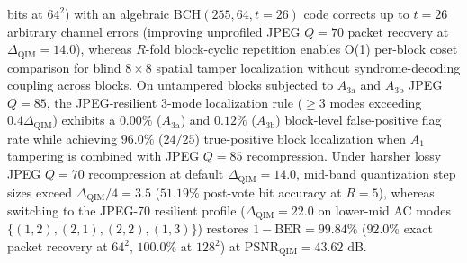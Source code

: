 \documentclass[conference,10pt]{IEEEtran}
\begin{document}
\begin{itemize}
bits at $64^2$) with an algebraic $\mathrm{BCH}(255,64,t=26)$ code corrects up to $t=26$ arbitrary channel errors (improving unprofiled JPEG $Q=70$ packet recovery at $\Delta_{\text{QIM}}=14.0$), whereas $R$-fold block-cyclic repetition enables O(1) per-block coset comparison for blind $8\times 8$ spatial tamper localization without syndrome-decoding coupling across blocks. On untampered blocks subjected to $A_{3\text{a}}$ and $A_{3\text{b}}$ JPEG $Q=85$, the JPEG-resilient 3-mode localization rule ($\ge 3$ modes exceeding $0.4\Delta_{\text{QIM}}$) exhibits a $0.00\%$ ($A_{3\text{a}}$) and $0.12\%$ ($A_{3\text{b}}$) block-level false-positive flag rate while achieving $96.0\%$ ($24/25$) true-positive block localization when $A_1$ tampering is combined with JPEG $Q=85$ recompression. Under harsher lossy JPEG $Q=70$ recompression at default $\Delta_{\text{QIM}} = 14.0$, mid-band quantization step sizes exceed $\Delta_{\text{QIM}}/4 = 3.5$ ($51.19\%$ post-vote bit accuracy at $R=5$), whereas switching to the JPEG-70 resilient profile ($\Delta_{\text{QIM}} = 22.0$ on lower-mid AC modes $\{(1,2),(2,1),(2,2),(1,3)\}$) restores $1 - \mathrm{BER} = 99.84\%$ ($92.0\%$ exact packet recovery at $64^2$, $100.0\%$ at $128^2$) at $\mathrm{PSNR}_{\text{QIM}} = 43.62\text{ dB}$.
\end{itemize}
\end{document}
